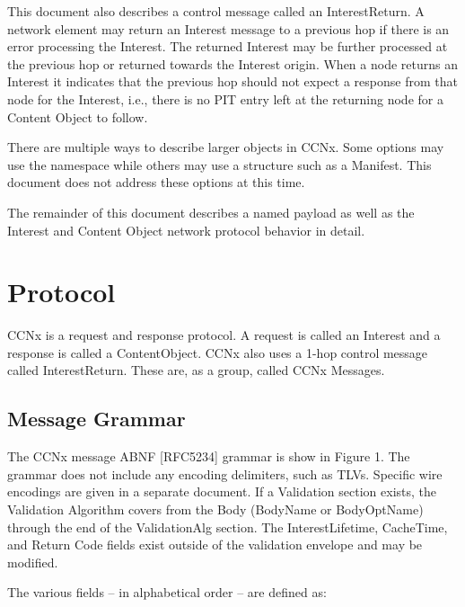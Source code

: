 \documentclass[12pt]{report}
\begin{document}
This document also describes a control message called an
InterestReturn.  A network element may return an Interest message to
a previous hop if there is an error processing the Interest.  The
returned Interest may be further processed at the previous hop or
returned towards the Interest origin.  When a node returns an
Interest it indicates that the previous hop should not expect a
response from that node for the Interest, i.e., there is no PIT entry
left at the returning node for a Content Object to follow.

There are multiple ways to describe larger objects in CCNx.  Some
options may use the namespace while others may use a structure such
as a Manifest.  This document does not address these options at this
time.

The remainder of this document describes a named payload as well as
the Interest and Content Object network protocol behavior in detail.

\section{Protocol}
CCNx is a request and response protocol.  A request is called an
Interest and a response is called a ContentObject.  CCNx also uses a
1-hop control message called InterestReturn.  These are, as a group,
called CCNx Messages.

\subsection{Message Grammar}
The CCNx message ABNF [RFC5234] grammar is show in Figure 1.  The
grammar does not include any encoding delimiters, such as TLVs.
Specific wire encodings are given in a separate document.  If a
Validation section exists, the Validation Algorithm covers from the
Body (BodyName or BodyOptName) through the end of the ValidationAlg
section.  The InterestLifetime, CacheTime, and Return Code fields
exist outside of the validation envelope and may be modified.

The various fields -- in alphabetical order -- are defined as:
\end{document}
